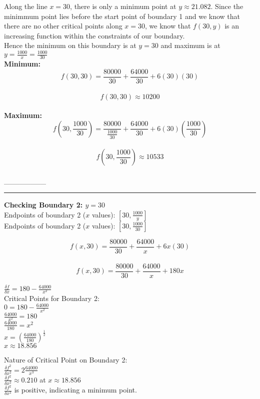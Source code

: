 \documentclass[11pt]{article}
\begin{document}
Along the line \(x = 30\), there is only a minimum point at
\(y \approx 21.082\). Since the minimmum point lies before the start
point of boundary 1 and we know that there are no other critical points
along \(x = 30\), we know that \(f(30,y)\) is an increasing function
within the constraints of our boundary.\\
Hence the minimum on this boundary is at \(y=30\) and maximum is at
\(y=\frac {1000}{x} = \frac {1000}{30}\)\\
\textbf{Minimum:}\\
\[f(30,30) = \frac {80000}{30} + \frac {64000}{30} + 6(30)(30)\]\\
\[f(30,30) \approx 10200\]\\
\textbf{Maximum:}\\
\[f(30,\frac {1000}{30}) = \frac {80000}{\frac {1000}{30}} + \frac {64000}{30} + 6(30)(\frac {1000}{30})\]\\
\[f(30,\frac {1000}{30}) \approx 10533\]\\
\_\_\_\_\_\_\_\_

    \begin{center}\rule{0.5\linewidth}{\linethickness}\end{center}

\textbf{Checking Boundary 2: \(y = 30\)}\\
Endpoints of boundary 2 (\(x\) values): \([30,\frac{1000}{y}]\)\\
Endpoints of boundary 2 (\(x\) values): \([30,\frac{1000}{30}]\)

\[f(x,30) = \frac {80000}{30} + \frac {64000}{x} + 6x(30)\]\\
\[f(x,30) = \frac {80000}{30} + \frac {64000}{x} + 180x\]

\(\frac{\delta f}{\delta x} = 180-\frac {64000}{x^2}\)\\
Critical Points for Boundary 2:\\
\(0 = 180-\frac {64000}{x^2}\)\\
\(\frac {64000}{x^2} = 180\)\\
\(\frac {64000}{180} = x^2\)\\
\(x = (\frac {64000}{180})^\frac{1}{2}\)\\
\(x \approx 18.856\)

Nature of Critical Point on Boundary 2:\\
\(\frac{\delta f^2}{\delta x^2} = 2\frac {64000}{x^3}\)\\
\(\frac{\delta f^2}{\delta x^2} \approx 0.210\) at
\(x \approx 18.856\)\\
\(\frac{\delta f^2}{\delta x^2}\) is positive, indicating a minimum
point.
\end{document}
